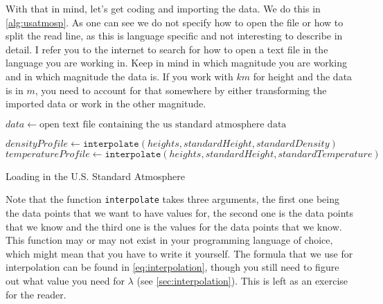 With that in mind, let's get coding and importing the data. We do this in \autoref{alg:usatmosp}. As one can see we do not specify how to open the file or how to split the read line, as this 
is language specific and not interesting to describe in detail. I refer you to the internet to search for how to open a text file in the language you are working in. Keep in mind in which 
magnitude you are working and in which magnitude the data is. If you work with $km$ for height and the data is in $m$, you need to account for that somewhere by either transforming the imported 
data or work in the other magnitude. 

\begin{algorithm}
    $data \leftarrow \text{open text file containing the us standard atmosphere data}$ \;

    $densityProfile \leftarrow \texttt{interpolate}(heights, standardHeight, standardDensity)$ \;
    $temperatureProfile \leftarrow \texttt{interpolate}(heights, standardHeight, standardTemperature)$ \;

    \caption{Loading in the U.S. Standard Atmosphere}
    \label{alg:usatmosp}
\end{algorithm}

Note that the function \texttt{interpolate} takes three arguments, the first one being the data points that we want to have values for, the second one is the data points that we know and the 
third one is the values for the data points that we know. This function may or may not exist in your programming language of choice, which might mean that you have to write it yourself. 
The formula that we use for interpolation can be found in \autoref{eq:interpolation}, though you still need to figure out what value you need for $\lambda$ (see \autoref{sec:interpolation}). 
This is left as an exercise for the reader.